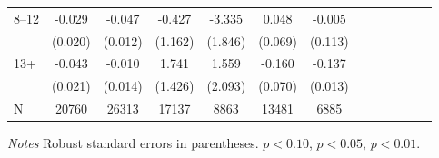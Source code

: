 \documentclass[12pt,english]{article}
\begin{document}
\begin{table}[p]
\begin{center}
\begin{adjustbox}{max width=.9\linewidth}
\begin{threeparttable}
{\begin{tabular}{l*{6}{S S}}
						\hspace*{10mm}8--12 &   -0.029         &   -0.047\sym{***}&   -0.427         &   -3.335\sym{*}  &    0.048         &   -0.005         \\
						&  (0.020)         &  (0.012)         &  (1.162)         &  (1.846)         &  (0.069)         &  (0.113)         \\
						\hspace*{10mm}13+ &   -0.043\sym{**} &   -0.010         &    1.741         &    1.559         &   -0.160\sym{**} &   -0.137\sym{***}\\
						&  (0.021)         &  (0.014)         &  (1.426)         &  (2.093)         &  (0.070)         &  (0.013)         \\
						\midrule
						N               &    20760         &    26313         &    17137         &     8863         &    13481         &     6885         \\
						\bottomrule
					\end{tabular}
					\begin{tablenotes}
						\item \footnotesize \textit{Notes} Robust standard errors in parentheses. \sym{*} \(p<0.10\), \sym{**} \(p<0.05\), \sym{***} \(p<0.01\).
					\end{tablenotes}
				}
			\end{threeparttable}
		\end{adjustbox}
	\end{center}
\end{table}
\clearpage
\end{document}

